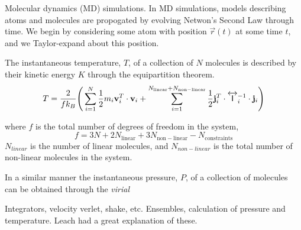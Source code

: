 Molecular dynamics (MD) simulations. In MD simulations,
models describing atoms and molecules are propogated by evolving
Netwon's Second Law through time. We begin by considering some atom
with position $\vec{r}(t)$ at some time $t$, and we Taylor-expand
about this position.

The instantaneous temperature, $T$, of a collection of $N$ molecules
is described by their kinetic energy $K$ through the equipartition
theorem.
\begin{equation}\label{Temperature}
T = \frac{2}{fk_B}\Bigg( \sum_{i=1}^{N} \frac{1}{2} m_i {\bf v}_i^T \cdot {\bf v}_i +
\sum_{i=1}^{N_{\mathrm{linear}}+N_{\mathrm{non-linear}}}  \frac{1}{2} {\bf j}_i^T \cdot
\overleftrightarrow{\mathsf{I}}_i^{-1} \cdot {\bf j}_i  \Bigg)
\end{equation}

where $f$ is the total number of degrees of freedom in the system,
\begin{equation}
f = 3 N + 2 N_{\mathrm{linear}} + 3 N_{\mathrm{non-linear}} - N_{\mathrm{constraints}}
\end{equation}
$N_{linear}$ is the number of linear molecules, and $N_{non-linear}$
is the total number of non-linear molecules in the system.

In a similar manner the instantaneous pressure, $P$, of a collection
of molecules can be obtained through the \textit{virial} 

Integrators, velocity verlet, shake, etc. Ensembles, calculation of
pressure and temperature. Leach had a great explanation of these.

